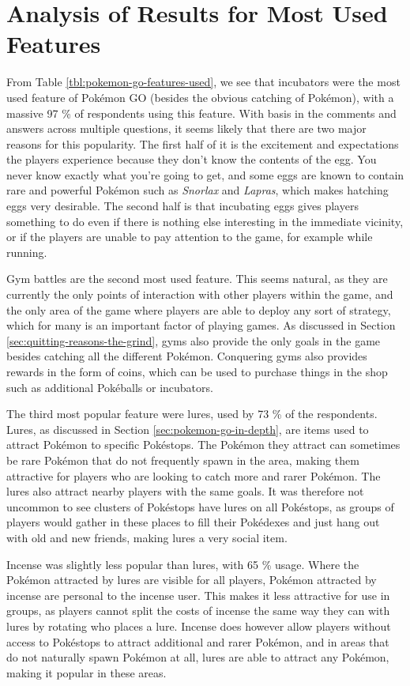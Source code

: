 \section{Analysis of Results for Most Used Features}
From Table \ref{tbl:pokemon-go-features-used}, we see that incubators were the most used feature of Pokémon GO (besides the obvious catching of Pokémon), with a massive 97 \% of respondents using this feature. With basis in the comments and answers across multiple questions, it seems likely that there are two major reasons for this popularity. The first half of it is the excitement and expectations the players experience because they don't know the contents of the egg. You never know exactly what you're going to get, and some eggs are known to contain rare and powerful Pokémon such as \emph{Snorlax} and \emph{Lapras}, which makes hatching eggs very desirable. The second half is that incubating eggs gives players something to do even if there is nothing else interesting in the immediate vicinity, or if the players are unable to pay attention to the game, for example while running.

Gym battles are the second most used feature. This seems natural, as they are currently the only points of interaction with other players within the game, and the only area of the game where players are able to deploy any sort of strategy, which for many is an important factor of playing games. As discussed in Section \ref{sec:quitting-reasons-the-grind}, gyms also provide the only goals in the game besides catching all the different Pokémon. Conquering gyms also provides rewards in the form of coins, which can be used to purchase things in the shop such as additional Pokéballs or incubators.

The third most popular feature were lures, used by 73 \% of the respondents. Lures, as discussed in Section \ref{sec:pokemon-go-in-depth}, are items used to attract Pokémon to specific Pokéstops. The Pokémon they attract can sometimes be rare Pokémon that do not frequently spawn in the area, making them attractive for players who are looking to catch more and rarer Pokémon. The lures also attract nearby players with the same goals. It was therefore not uncommon to see clusters of Pokéstops have lures on all Pokéstops, as groups of players would gather in these places to fill their Pokédexes and just hang out with old and new friends, making lures a very social item.

Incense was slightly less popular than lures, with 65 \% usage. Where the Pokémon attracted by lures are visible for all players, Pokémon attracted by incense are personal to the incense user. This makes it less attractive for use in groups, as players cannot split the costs of incense the same way they can with lures by rotating who places a lure. Incense does however allow players without access to Pokéstops to attract additional and rarer Pokémon, and in areas that do not naturally spawn Pokémon at all, lures are able to attract any Pokémon, making it popular in these areas.

